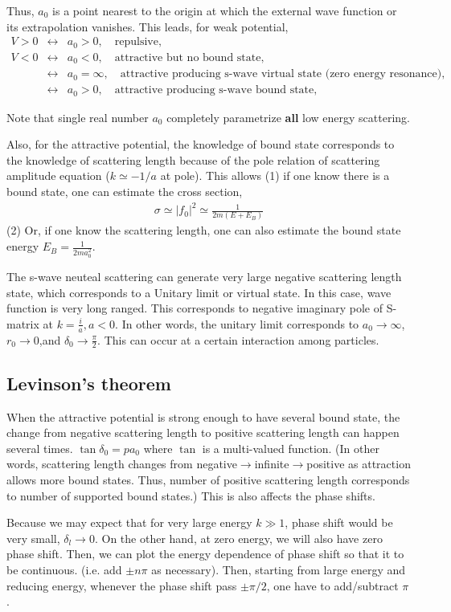 \documentclass[10pt]{book}
\newcommand{\bea}{\begin{eqnarray}}
\newcommand{\eea}{\end{eqnarray}}
\newcommand{\no}{\nonumber \\}
\begin{document}
Thus, $a_0$ is a point nearest to the origin at which the external wave function or
its extrapolation vanishes. This leads, for weak potential,
\bea 
V>0  &\leftrightarrow& a_0 >0, \quad \mbox{repulsive},\no 
V<0 &\leftrightarrow& a_0 <0, \quad \mbox{attractive but no bound state},\no 
    &\leftrightarrow& a_0=\infty,\quad \mbox{attractive producing s-wave virtual state
    (zero energy resonance)},\no 
    &\leftrightarrow& a_0 >0,\quad \mbox{attractive producing s-wave bound state},
\eea 

Note that single real number $a_0$ completely parametrize {\bf all} low energy scattering.

Also, for the attractive potential, the knowledge of bound state corresponds to the knowledge of
scattering length because of the pole relation of scattering amplitude equation ($k\simeq -1/a$ at pole). 
This allows (1) if one know there is a bound state, one can estimate the cross section,
\bea 
\sigma \simeq |f_0|^2\simeq \frac{1}{2m(E+E_B)}
\eea 
(2) Or, if one know the scattering length, one can also estimate the bound state energy $E_B=\frac{1}{2m a_0^2}$.

The s-wave neuteal scattering can generate very large negative scattering length state, which 
corresponds to a Unitary limit or virtual state. In this case, wave function is very long ranged.
This corresponds to negative imaginary pole of S-matrix at $k=\frac{i}{a}, a< 0$.   In other words,
the unitary limit corresponds to $a_0\to \infty$, $r_0\to 0$,and  $\delta_0\to \frac{\pi}{2}$. 
This can occur at a certain interaction among particles. 


\subsection{Levinson's theorem }
When the attractive potential is strong enough to have several bound state,
the change from negative scattering length to positive scattering length can happen
several times.  $\tan\delta_0=p a_0$ where $\tan$ is a multi-valued function. 
(In other words, scattering length changes from negative$\to$infinite$\to$positive
as attraction allows more bound states. Thus, number of positive scattering length 
corresponds to number of supported bound states.) This is also affects the phase shifts. 

Because we may expect that for very large energy $k\gg 1$, phase shift would be very small,
$\delta_l\to 0$. On the other hand, at zero energy, we will also have zero phase shift. 
Then, we can plot the energy dependence of phase shift so that 
it to be continuous. (i.e. add $\pm n\pi$ as necessary). 
Then, starting from large energy and reducing energy, whenever the phase shift pass
$\pm \pi/2$, one have to add/subtract $\pi$. 
\end{document}
